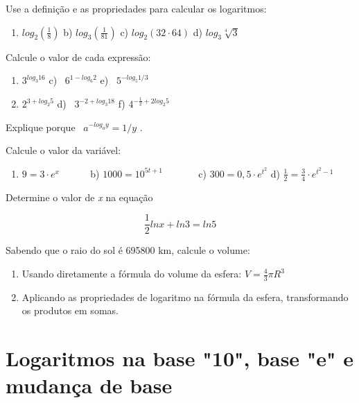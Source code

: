 \begin{exercicios}
	\exitem{} Use a definição e as propriedades para calcular os logaritmos:
    \begin{enumerate}
	    \item  \( log_{2} \left( \frac{1}{8} \right)  \) \quad \quad b)  \( log_{3} \left( \frac{1}{81} \right)  \) \quad \quad c)  \( log_{2} \left( 32 \cdot 64 \right)  \) \quad d)  \( log_{3}\sqrt[4]{3} \)  
    \end{enumerate}

	\exitem{} Calcule o valor de cada expressão:
    \begin{enumerate}
	    \item  \( 3^{log_{3}16} \) \quad \quad c)~  \( 6^{1-log_{6}2} \) \quad \quad e)~  \( 5^{-log_{5}1/3} \) 

	    \item  \( 2^{3+log_{2}5} \) \quad \quad d)~  \( 3^{-2+log_{3}18} \) \quad \quad f)  \( 4^{-\frac{1}{2}+2log_{2}5} \) 
    \end{enumerate}

    \exitem{} Explique porque~  \( a^{-log_{a}y}=1/y \) .

    \exitem{} Calcule o valor da variável:

    \begin{enumerate}
	    \item  \( 9=3 \cdot e^{x} \) \quad ~~~~~ b)  \( 1000=10^{5t+1} \) ~~~~~~ c)  \( 300=0,5 \cdot e^{t^{2}} \) \quad d) \( \frac{1}{2}=\frac{3}{4} \cdot e^{t^{2}-1} \) 
    \end{enumerate}

	\exitem{} Determine o valor de \textit{x} na equação

    $$\frac{1}{2}ln x+ln3=ln5$$ 

	\exitem{} Sabendo que o raio do sol é 695800 km, calcule o volume:

    \begin{enumerate}
	    \item Usando diretamente a fórmula do volume da esfera:  \( V=\frac{4}{3} \pi R^{3} \)  

	    \item Aplicando as propriedades de logaritmo na fórmula da esfera, transformando os produtos em somas.
    \end{enumerate}
\end{exercicios}

\section{Logaritmos na base "10", base "e" e mudança de base}

